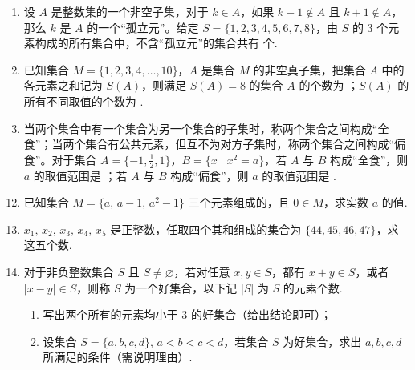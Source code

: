 \documentclass[a4paper,11pt]{article}
\begin{document}
\begin{enumerate}

\item 设 $A$ 是整数集的一个非空子集，对于 $k\in A$，如果 $k-1\notin A$ 且 $k+1\notin A$，那么 $k$ 是 $A$ 的一个“孤立元”。给定 $S=\{1,2,3,4,5,6,7,8\}$，由 $S$ 的 3 个元素构成的所有集合中，不含“孤立元”的集合共有 \blankline 个.


\item 已知集合 $M=\{1,2,3,4,\dots,10\}$，$A$ 是集合 $M$ 的非空真子集，把集合 $A$ 中的各元素之和记为 $S(A)$，则满足 $S(A)=8$ 的集合 $A$ 的个数为 \blankline；$S(A)$ 的所有不同取值的个数为 \blankline.


\item 当两个集合中有一个集合为另一个集合的子集时，称两个集合之间构成“全食”；当两个集合有公共元素，但互不为对方子集时，称两个集合之间构成“偏食”。对于集合 $A=\{-1,\tfrac{1}{2},1\}$，$B=\{x \mid x^2=a\}$，若 $A$ 与 $B$ 构成“全食”，则 $a$ 的取值范围是 \blankline；若 $A$ 与 $B$ 构成“偏食”，则 $a$ 的取值范围是 \blankline.


\end{enumerate}


\begin{enumerate}
\setcounter{enumi}{11}

\item 已知集合 $M=\{a,\, a-1,\, a^2-1\}$ 三个元素组成的，且 $0\in M$，求实数 $a$ 的值.


\ansspace[5]
\item $x_1,\, x_2,\, x_3,\, x_4,\, x_5$ 是正整数，任取四个其和组成的集合为 $\{44,45,46,47\}$，求这五个数.

\ansspace[5]
\ansneed{7cm}
\item 对于非负整数集合 $S$ 且 $S\neq\varnothing$，若对任意 $x,y\in S$，都有 $x+y\in S$，或者 $|x-y|\in S$，则称 $S$ 为一个好集合，以下记 $|S|$ 为 $S$ 的元素个数.
\begin{enumerate}[label=(\arabic*)]
\item 写出两个所有的元素均小于 $3$ 的好集合（给出结论即可）；
\item 设集合 $S=\{a,b,c,d\},\, a<b<c<d$，若集合 $S$ 为好集合，求出 $a,b,c,d$ 所满足的条件（需说明理由）.
\end{enumerate}

\ansspace*[7]
\end{enumerate}
\end{document}

